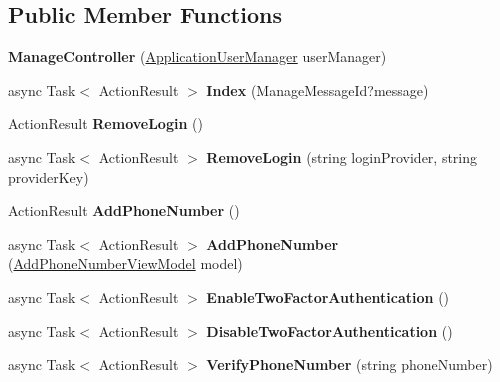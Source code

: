 \subsection*{Public Member Functions}
\begin{DoxyCompactItemize}
\item 
{\bfseries Manage\+Controller} (\hyperlink{a00019}{Application\+User\+Manager} user\+Manager)\hypertarget{a00133_aaad5030b9b38525b5e8c4f1768f0541e}{}\label{a00133_aaad5030b9b38525b5e8c4f1768f0541e}

\item 
async Task$<$ Action\+Result $>$ {\bfseries Index} (Manage\+Message\+Id?message)\hypertarget{a00133_a08959bdc8a1b37a86066d10f224f5e75}{}\label{a00133_a08959bdc8a1b37a86066d10f224f5e75}

\item 
Action\+Result {\bfseries Remove\+Login} ()\hypertarget{a00133_a2f175ab4793c56677b07002bc57a887e}{}\label{a00133_a2f175ab4793c56677b07002bc57a887e}

\item 
async Task$<$ Action\+Result $>$ {\bfseries Remove\+Login} (string login\+Provider, string provider\+Key)\hypertarget{a00133_ae72da909912ec10c002636297d243f83}{}\label{a00133_ae72da909912ec10c002636297d243f83}

\item 
Action\+Result {\bfseries Add\+Phone\+Number} ()\hypertarget{a00133_ac40355c33a7efe87e8502b0f9ada2b81}{}\label{a00133_ac40355c33a7efe87e8502b0f9ada2b81}

\item 
async Task$<$ Action\+Result $>$ {\bfseries Add\+Phone\+Number} (\hyperlink{a00008}{Add\+Phone\+Number\+View\+Model} model)\hypertarget{a00133_a29d9f4e7cf795cbc5d0a1acbc3dd2f3a}{}\label{a00133_a29d9f4e7cf795cbc5d0a1acbc3dd2f3a}

\item 
async Task$<$ Action\+Result $>$ {\bfseries Enable\+Two\+Factor\+Authentication} ()\hypertarget{a00133_aefe8d4cf6fff8907beba2fa2bd2d6dc3}{}\label{a00133_aefe8d4cf6fff8907beba2fa2bd2d6dc3}

\item 
async Task$<$ Action\+Result $>$ {\bfseries Disable\+Two\+Factor\+Authentication} ()\hypertarget{a00133_a2b689354ee7111fb446a910c6df4af9b}{}\label{a00133_a2b689354ee7111fb446a910c6df4af9b}

\item 
async Task$<$ Action\+Result $>$ {\bfseries Verify\+Phone\+Number} (string phone\+Number)\hypertarget{a00133_ad9e07cbf467f6502de0a78cabc2eaed1}{}\label{a00133_ad9e07cbf467f6502de0a78cabc2eaed1}


\end{DoxyCompactItemize}
